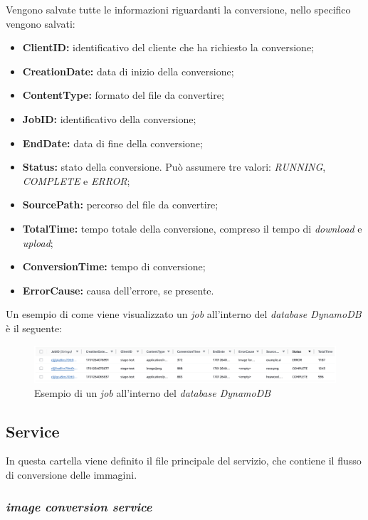 Vengono salvate tutte le informazioni riguardanti la conversione, nello
specifico vengono salvati:
\begin{itemize}
    \item \textbf{ClientID:} identificativo del cliente che ha richiesto la
          conversione;
    \item \textbf{CreationDate:} data di inizio della conversione;
    \item \textbf{ContentType:} formato del file da convertire;
    \item \textbf{JobID:} identificativo della conversione;
    \item \textbf{EndDate:} data di fine della conversione;
    \item \textbf{Status:} stato della conversione. Può assumere tre valori: \emph{RUNNING}, \emph{COMPLETE} e \emph{ERROR};
    \item \textbf{SourcePath:} percorso del file da convertire;
    \item \textbf{TotalTime:} tempo totale della conversione, compreso il tempo
          di \emph{download} e \emph{upload};
    \item \textbf{ConversionTime:} tempo di conversione;
    \item \textbf{ErrorCause:} causa dell'errore, se presente.
\end{itemize}

Un esempio di come viene visualizzato un \emph{job} all'interno del
\emph{database DynamoDB} è il seguente:
\begin{figure}[H]
    \centering
    \includegraphics[width=1\textwidth]{images/esempio-job-dynamo.png}
    \caption{Esempio di un \emph{job} all'interno del \emph{database DynamoDB}}
\end{figure}

\subsection{Service}

In questa cartella viene definito il file principale del servizio, che contiene
il flusso di conversione delle immagini.

\subsubsection{\emph{image conversion service}}

